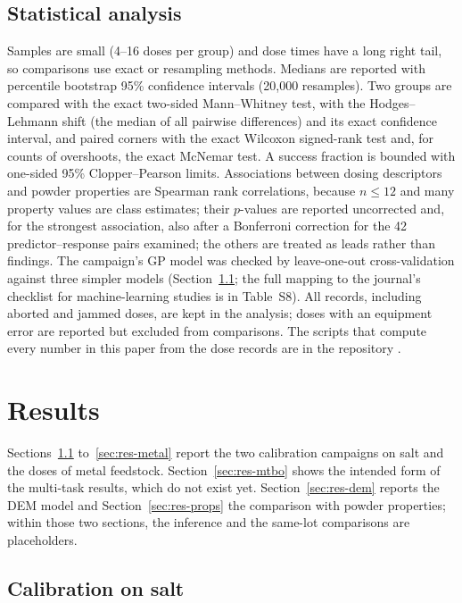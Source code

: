 \documentclass[preprint,12pt]{elsarticle}
\begin{document}
\subsection{Statistical analysis}
\label{sec:stats}

Samples are small (4--16 doses per group) and dose times have a long right tail, so comparisons use exact or resampling methods. Medians are reported with percentile bootstrap 95\% confidence intervals (20{,}000 resamples). Two groups are compared with the exact two-sided Mann--Whitney test, with the Hodges--Lehmann shift (the median of all pairwise differences) and its exact confidence interval, and paired corners with the exact Wilcoxon signed-rank test and, for counts of overshoots, the exact McNemar test. A success fraction is bounded with one-sided 95\% Clopper--Pearson limits. Associations between dosing descriptors and powder properties are Spearman rank correlations, because $n \le 12$ and many property values are class estimates; their $p$-values are reported uncorrected and, for the strongest association, also after a Bonferroni correction for the 42 predictor--response pairs examined; the others are treated as leads rather than findings. The campaign's GP model was checked by leave-one-out cross-validation against three simpler models (Section~\ref{sec:res-bo}; the full mapping to the journal's checklist for machine-learning studies is in Table~S8). All records, including aborted and jammed doses, are kept in the analysis; doses with an equipment error are reported but excluded from comparisons. The scripts that compute every number in this paper from the dose records are in the repository \cite{PowderDoserRepo}.

\section{Results}
\label{sec:results}

Sections~\ref{sec:res-bo} to~\ref{sec:res-metal} report the two calibration campaigns on salt and the doses of metal feedstock. Section~\ref{sec:res-mtbo} shows the intended form of the multi-task results, which do not exist yet. Section~\ref{sec:res-dem} reports the DEM model and Section~\ref{sec:res-props} the comparison with powder properties; within those two sections, the inference and the same-lot comparisons are placeholders.

\subsection{Calibration on salt}
\label{sec:res-bo}
\end{document}
